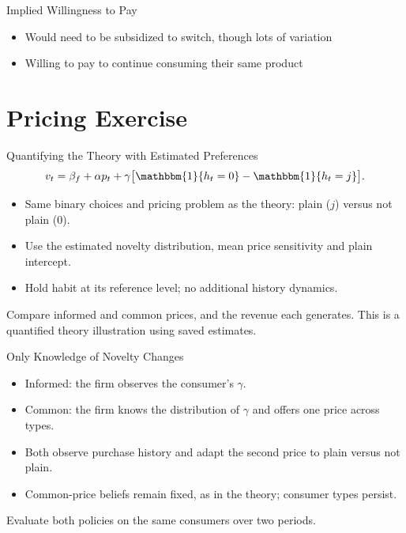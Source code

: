 \documentclass[aspectratio=169,professionalfonts]{beamer}
\newcommand{\shortbuttons}{}
\begin{document}
\gdef\shortbuttons{\hyperlink{short-62}{\beamergotobutton{Controlled WTP}}}
\begin{frame}[label=short-31]{Implied Willingness to Pay}
  \centering
  
  \begin{itemize}
    \item Would need to be subsidized to switch, though lots of variation
    \item Willing to pay to continue consuming their same product
  \end{itemize}
\end{frame}


\section{Pricing Exercise}

\gdef\shortbuttons{}
\begin{frame}[label=short-34]{Quantifying the Theory with Estimated Preferences}
  \[
    v_t=\beta_f+\alpha p_t+\gamma\big[\mathbbm{1}\{h_t=0\}-\mathbbm{1}\{h_t=j\}\big].
  \]
  \begin{itemize}
    \item Same binary choices and pricing problem as the theory: plain ($j$) versus not plain ($0$).
    \item Use the estimated novelty distribution, mean price sensitivity and plain intercept.
    \item Hold habit at its reference level; no additional history dynamics.
  \end{itemize}
  \begin{tcolorbox}
    Compare informed and common prices, and the revenue each generates.
    This is a quantified theory illustration using saved estimates.
  \end{tcolorbox}
\end{frame}

\gdef\shortbuttons{}
\begin{frame}[label=short-40]{Only Knowledge of Novelty Changes}
  \begin{itemize}
    \item Informed: the firm observes the consumer's $\gamma$.
    \item Common: the firm knows the distribution of $\gamma$ and offers one price across types.
    \item Both observe purchase history and adapt the second price to plain versus not plain.
    \item Common-price beliefs remain fixed, as in the theory; consumer types persist.
  \end{itemize}
  \begin{tcolorbox}
    Evaluate both policies on the same consumers over two periods.
  \end{tcolorbox}
\end{frame}
\end{document}
